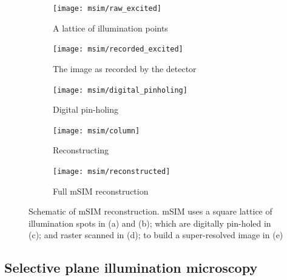 \begin{figure}
  \centering
  \begin{subfigure}[t]{0.185\textwidth}
    \centering
    \texttt{[image: msim/raw\_excited]}
    \caption{A lattice of illumination points}\label{fig:msim/raw_excited}
  \end{subfigure}\hfill
  \begin{subfigure}[t]{0.185\textwidth}
    \centering
    \texttt{[image: msim/recorded\_excited]}
    \caption{The image as recorded by the detector}\label{fig:msim/recorded_excited}
  \end{subfigure}\hfill
  \begin{subfigure}[t]{0.185\textwidth}
    \centering
    \texttt{[image: msim/digital\_pinholing]}
    \caption{Digital pin-holing}\label{fig:msim/digital_pinholing}
  \end{subfigure}\hfill
  \begin{subfigure}[t]{0.185\textwidth}
    \centering
    \texttt{[image: msim/column]}
    \caption{Reconstructing}\label{fig:msim/column}
  \end{subfigure}\hfill
  \begin{subfigure}[t]{0.185\textwidth}
    \centering
    \texttt{[image: msim/reconstructed]}
    \caption{Full mSIM reconstruction}\label{fig:msim/reconstructed}
  \end{subfigure} %
  \caption[Schematic of \gls{mSIM} reconstruction]{
  Schematic of \gls{mSIM} reconstruction. \gls{mSIM} uses a square lattice of illumination spots in (a) and (b); which are digitally pin-holed in (c); and raster scanned in (d); to build a super-resolved image in (e)}\label{fig:mSIM}
\end{figure}



\subsection{Selective plane illumination microscopy}

